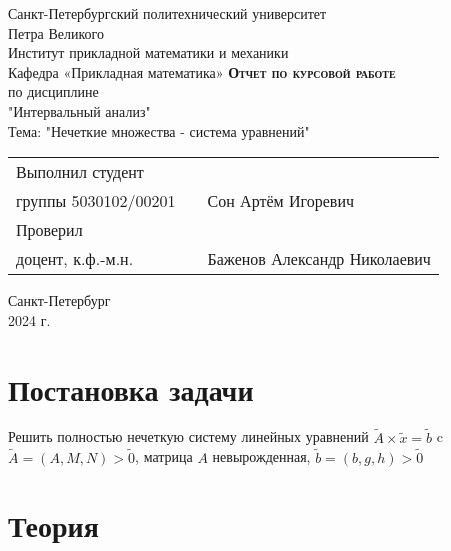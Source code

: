 \documentclass[12pt]{article}
\begin{document}
\begin{titlepage}
	\begin{center}
		\large
		Санкт-Петербургский политехнический университет\\Петра Великого\\
		\vspace{0.5cm}
		Институт прикладной математики и механики\\
		\vspace{0.25cm}
		Кафедра «Прикладная математика»
		\vfill
		\textsc{\LARGE\textbf{Отчет по курсовой работе}}\\[5mm]
		\Large
		по дисциплине\\"Интервальный анализ" \\
		Тема: "Нечеткие множества - система уравнений"
	\end{center}
	\vfill
	\begin{tabular}{l p{175pt} l}
		Выполнил студент \\ группы 5030102/00201 && Сон Артём Игоревич
		\vspace{0.25cm}
		\\Проверил \\ доцент, к.ф.-м.н. && Баженов Александр Николаевич
	\end{tabular}
	\vfill
	\begin{center}
		Санкт-Петербург \\ 2024 г.
	\end{center}


\end{titlepage}

\section{Постановка задачи}

Решить полностью нечеткую систему линейных уравнений $\tilde{A} \times \tilde{x} = \tilde{b}$ c
$\tilde{A} = (A, M, N) > \tilde{0}$, матрица $A$ невырожденная, $\tilde{b} = (b,
	g, h) > \tilde{0}$



\section{Теория}
\end{document}
